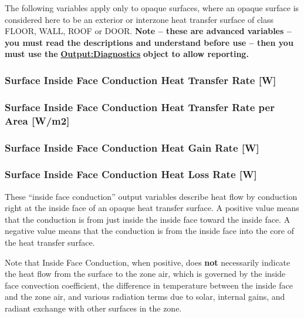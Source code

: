 The following variables apply only to opaque surfaces, where an opaque surface is considered here to be an exterior or interzone heat transfer surface of class FLOOR, WALL, ROOF or DOOR. \textbf{Note -- these are advanced variables -- you must read the descriptions and understand before use -- then you must use the} \textbf{\hyperref[outputdiagnostics]{Output:Diagnostics}} \textbf{object to allow reporting.}

\subsubsection{Surface Inside Face Conduction Heat Transfer Rate {[}W{]}}\label{surface-inside-face-conduction-heat-transfer-rate-w}

\subsubsection{Surface Inside Face Conduction Heat Transfer Rate per Area {[}W/m2{]}}\label{surface-inside-face-conduction-heat-transfer-rate-per-area-wm2}

\subsubsection{Surface Inside Face Conduction Heat Gain Rate {[}W{]}}\label{surface-inside-face-conduction-heat-gain-rate-w}

\subsubsection{Surface Inside Face Conduction Heat Loss Rate {[}W{]}}\label{surface-inside-face-conduction-heat-loss-rate-w}

These ``inside face conduction'' output variables describe heat flow by conduction right at the inside face of an opaque heat transfer surface. A positive value means that the conduction is from just inside the inside face toward the inside face. A negative value means that the conduction is from the inside face into the core of the heat transfer surface.

Note that Inside Face Conduction, when positive, does \textbf{not} necessarily indicate the heat flow from the surface to the zone air, which is governed by the inside face convection coefficient, the difference in temperature between the inside face and the zone air, and various radiation terms due to solar, internal gains, and radiant exchange with other surfaces in the zone.

